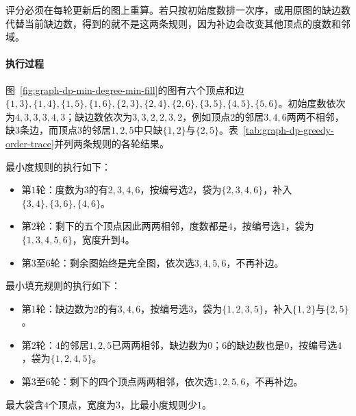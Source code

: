 评分必须在每轮更新后的图上重算。若只按初始度数排一次序，或用原图的缺边数代替当前缺边数，得到的就不是这两条规则，因为补边会改变其他顶点的度数和邻域。

\paragraph{执行过程}
图~\ref{fig:graph-dp-min-degree-min-fill}的图有六个顶点和边$\{1,3\},\allowbreak\{1,4\},\allowbreak\{1,5\},\allowbreak\{1,6\},\allowbreak\{2,3\},\allowbreak\{2,4\},\allowbreak\{2,6\},\allowbreak\{3,5\},\allowbreak\{4,5\},\allowbreak\{5,6\}$。初始度数依次为$4,3,3,3,4,3$；缺边数依次为$3,3,2,2,3,2$，例如顶点$2$的邻居$3,4,6$两两不相邻，缺$3$条边，而顶点$3$的邻居$1,2,5$中只缺$\{1,2\}$与$\{2,5\}$。表~\ref{tab:graph-dp-greedy-order-trace}并列两条规则的各轮结果。

最小度规则的执行如下：
\begin{itemize}
  \item 第$1$轮：度数为$3$的有$2,3,4,6$，按编号选$2$，袋为$\{2,3,4,6\}$，补入$\{3,4\},\allowbreak\{3,6\},\allowbreak\{4,6\}$。
  \item 第$2$轮：剩下的五个顶点因此两两相邻，度数都是$4$，按编号选$1$，袋为$\{1,3,4,5,6\}$，宽度升到$4$。
  \item 第$3$至$6$轮：剩余图始终是完全图，依次选$3,4,5,6$，不再补边。
\end{itemize}
最小填充规则的执行如下：
\begin{itemize}
  \item 第$1$轮：缺边数为$2$的有$3,4,6$，按编号选$3$，袋为$\{1,2,3,5\}$，补入$\{1,2\}$与$\{2,5\}$。
  \item 第$2$轮：$4$的邻居$1,2,5$已两两相邻，缺边数为$0$；$6$的缺边数也是$0$，按编号选$4$，袋为$\{1,2,4,5\}$。
  \item 第$3$至$6$轮：剩下的四个顶点两两相邻，依次选$1,2,5,6$，不再补边。
\end{itemize}
最大袋含$4$个顶点，宽度为$3$，比最小度规则少$1$。

